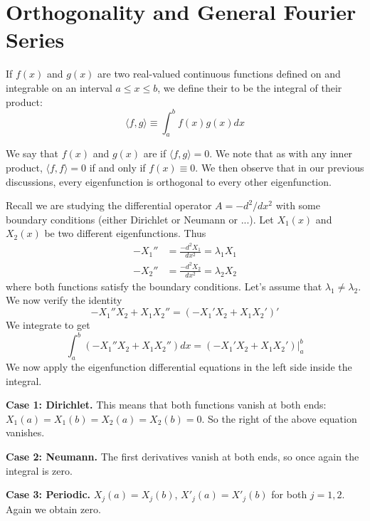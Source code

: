 \section{Orthogonality and General Fourier Series}


\begin{definition}
    If $f(x)$ and $g(x)$ are two real-valued continuous functions defined on and integrable on an interval $a\leq x \leq b$, we define their  to be the integral of their product: \begin{equation}
        \langle f,g\rangle \equiv \int_a^bf(x)g(x)dx
    \end{equation}
\end{definition}

We say that $f(x)$ and $g(x)$ are  if $\langle f, g\rangle = 0$. We note that as with any inner product, $\langle f, f\rangle = 0$ if and only if $f(x) \equiv 0$. We then observe that in our previous discussions, every eigenfunction is orthogonal to every other eigenfunction. 

Recall we are studying the differential operator $A = -d^2/dx^2$ with some boundary conditions (either Dirichlet or Neumann or ...). Let $X_1(x)$ and $X_2(x)$ be two different eigenfunctions. Thus \begin{align*}
    -X_1'' &= \frac{-d^2X_1}{dx^2} = \lambda_1X_1 \\
    -X_2'' &= \frac{-d^2X_2}{dx^2} = \lambda_2X_2
\end{align*}
where both functions satisfy the boundary conditions. Let's assume that $\lambda_1 \neq \lambda_2$. We now verify the identity \begin{equation*}
    -X_1''X_2 + X_1X_2'' = (-X_1'X_2+X_1X_2')'
\end{equation*}
We integrate to get \begin{equation}
    \int_a^b(-X_1''X_2+X_1X_2'')dx = (-X_1'X_2+X_1X_2')\Bigg\rvert_a^b
\end{equation}
We now apply the eigenfunction differential equations in the left side inside the integral.

\textbf{Case 1: Dirichlet.} This means that both functions vanish at both ends: $X_1(a) = X_1(b) = X_2(a) = X_2(b) = 0$. So the right of the above equation vanishes.

\textbf{Case 2: Neumann.} The first derivatives vanish at both ends, so once again the integral is zero.

\textbf{Case 3: Periodic.} $X_j(a) = X_j(b)$, $X'_j(a) = X'_j(b)$ for both $j = 1,2$. Again we obtain zero.



